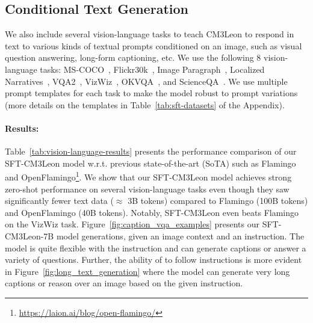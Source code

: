 \documentclass{article}
\newcommand{\model}{CM3Leon}
\begin{document}
\subsection{Conditional Text Generation}
We also include several vision-language tasks to teach \model{} to respond in text to various kinds of textual prompts conditioned on an image, such as visual question answering, long-form captioning, etc. We use the following 8 vision-language tasks: MS-COCO~\citep{chen2015microsoft}, Flickr30k~\citep{young2014image}, Image Paragraph~\citep{krause2017hierarchical}, Localized Narratives~\citep{pont2020connecting}, VQA2~\cite{goyal2017making}, VizWiz~\citep{gurari2018vizwiz}, OKVQA~\citep{marino2019ok}, and ScienceQA~\citep{lu2022learn}. We use multiple prompt templates for each task to make the model robust to prompt variations (more details on the templates in Table~\ref{tab:sft-datasets} of the Appendix).

\paragraph{Results:}
Table~\ref{tab:vision-language-results} presents the performance comparison of our SFT-\model{} model w.r.t. previous state-of-the-art (SoTA) such as Flamingo~\citep{alayrac2022flamingo} and OpenFlamingo\footnote{\url{https://laion.ai/blog/open-flamingo/}}. We show that our SFT-\model{} model achieves strong zero-shot performance on several vision-language tasks even though they saw significantly fewer text data ($\approx$ 3B tokens) compared to Flamingo (100B tokens) and OpenFlamingo (40B tokens). Notably, SFT-\model{} even beats Flamingo on the VizWiz task. Figure~\ref{fig:caption_vqa_examples} presents our SFT-\model{}-7B model generations, given an image context and an instruction. The model is quite flexible with the instruction and can generate captions or answer a variety of questions. Further, the ability of to follow instructions is more evident in Figure~\ref{fig:long_text_generation} where the model can generate very long captions or reason over an image based on the given instruction. 
\end{document}
